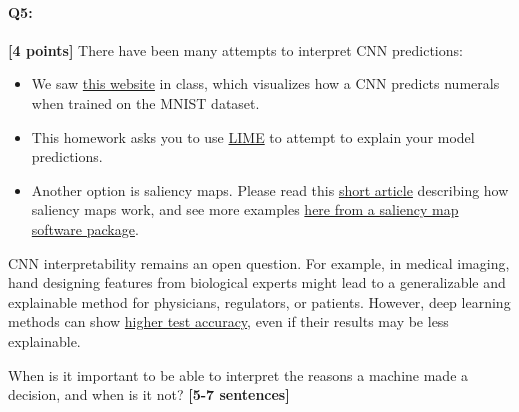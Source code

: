 \pagebreak
\paragraph{Q5:} \textbf{[4 points]} There have been many attempts to interpret CNN predictions:
\begin{itemize}
    \item We saw \href{https://www.cs.cmu.edu/~aharley/vis/conv/}{this website} in class, which visualizes how a CNN predicts numerals when trained on the MNIST dataset.
    
    \item This homework asks you to use \href{https://www.oreilly.com/content/introduction-to-local-interpretable-model-agnostic-explanations-lime/}{LIME} to attempt to explain your model predictions. 

    \item Another option is saliency maps. Please read this \href{https://opendatascience.com/visualizing-your-convolutional-neural-network-predictions-with-saliency-maps/}{short article} describing how saliency maps work, and see more examples \href{https://github.com/jacobgil/pytorch-grad-cam}{here from a saliency map software package}.
\end{itemize}
CNN interpretability remains an open question. For example, in medical imaging, hand designing features from biological experts might lead to a generalizable and explainable method for physicians, regulators, or patients. However, deep learning methods can show \href{https://drive.google.com/file/d/1bDAqEtW482OJeqMBt5A4AradVa4gf_o9/view}{higher test accuracy}, even if their results may be less explainable.

\begin{tcolorbox}[colback=orange!5!white,colframe=orange!75!black]
When is it important to be able to interpret the reasons a machine made a decision, and when is it not? \textbf{[5-7 sentences]}
\end{tcolorbox}



